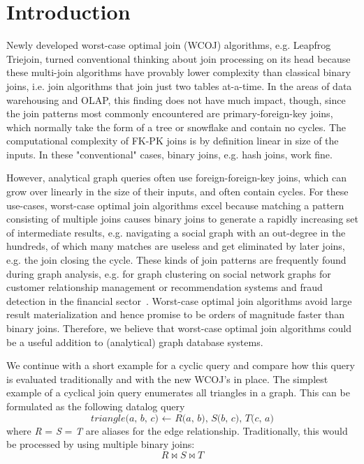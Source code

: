 \section{Introduction} \label{sec:introduction}







%


Newly developed worst-case optimal join (WCOJ) algorithms, e.g. Leapfrog Triejoin, turned conventional thinking about join processing
on its head because these multi-join algorithms have provably lower complexity than classical binary joins,
i.e. join algorithms that join just two tables at-a-time.
In the areas of data warehousing and OLAP, this finding does not have much impact, though,
since the join patterns most commonly encountered are primary-foreign-key joins,
which normally take the form of a tree or snowflake and contain no cycles.
The computational complexity of FK-PK joins is by definition linear in size of the inputs.
In these "conventional" cases, binary joins, e.g. hash joins, work fine.

However, analytical graph queries often use foreign-foreign-key joins, which can grow over linearly in the size of their inputs,
and often contain cycles.
For these use-cases, worst-case optimal join algorithms excel because matching a pattern consisting of multiple joins causes
binary joins to generate a rapidly increasing set of intermediate results, e.g. navigating a social graph with an out-degree in the
hundreds, of which many matches are useless and get eliminated by later joins, e.g. the join closing the cycle.
These kinds of join patterns are frequently found during graph analysis,
e.g. for graph clustering on social network graphs for customer relationship management or recommendation systems
and fraud detection in the financial sector~\cite{fraud-detection,twitter-diamond}.
Worst-case optimal join algorithms avoid large result materialization and hence promise to be orders of magnitude faster than binary joins.
Therefore, we believe that worst-case optimal join algorithms could be a useful addition to (analytical) graph database systems.

We continue with a short example for a cyclic query and compare how this query is evaluated traditionally and with the new WCOJ's in place.
The simplest example of a cyclical join query enumerates all triangles in a graph.
This can be formulated as the following datalog query
\begin{equation}
    \textit{triangle(a, b, c) $\leftarrow$ R(a, b), S(b, c), T(c, a)} \label{eqn:triangle}
\end{equation} 
 where \textit{R} = \textit{S} = \textit{T} are aliases for the edge relationship.
Traditionally, this would be processed by using multiple binary joins:
\begin{equation}
    R \bowtie S \bowtie T
\end{equation}

